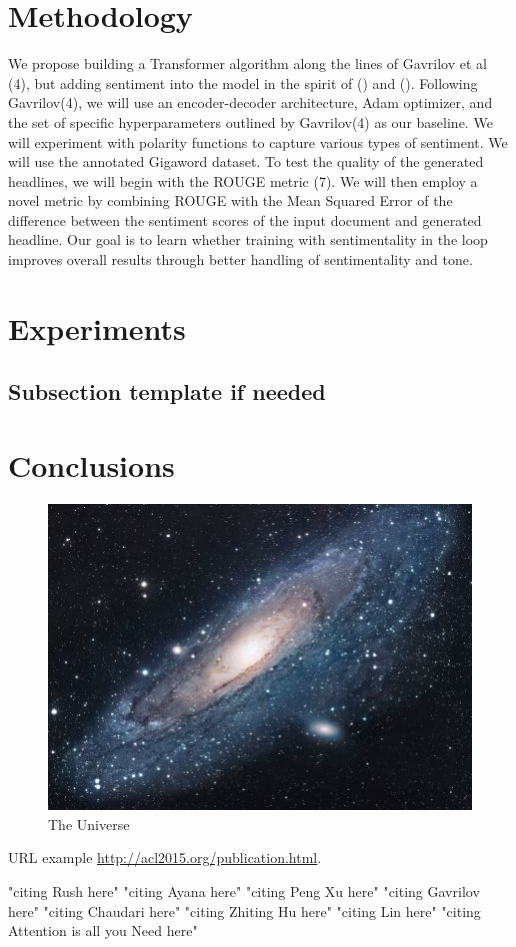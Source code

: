\documentclass[11pt]{article}
\begin{document}
\section{Methodology}
We propose building a Transformer algorithm along the lines of Gavrilov et al (4), but adding sentiment into the model in the spirit of () and (). Following Gavrilov(4), we will use an encoder-decoder architecture, Adam optimizer, and the set of specific hyperparameters outlined by Gavrilov(4) as our baseline. We will experiment with polarity functions to capture various types of sentiment. We will use the annotated Gigaword dataset. 
	To test the quality of the generated headlines, we will begin with the ROUGE metric (7). We will then employ a novel metric by combining ROUGE with the Mean Squared Error of the difference between the sentiment scores of the input document and generated headline. Our goal is to learn whether training with sentimentality in the loop improves overall results through better handling of sentimentality and tone.
\section{Experiments}
\subsection{Subsection template if needed}
\section{Conclusions}

\begin{figure}[h!]
\centering
\includegraphics[scale=1.7]{universe}
\caption{The Universe}
\label{fig:universe}
\end{figure}

URL example
\url{http://acl2015.org/publication.html}.

"citing Rush here" \citep{rush2015neural}
"citing Ayana here" \cite{Ayana2017}
"citing Peng Xu here" \cite{DBLP:journals/corr/abs-1902-07110}
"citing Gavrilov here" \cite{DBLP:journals/corr/abs-1901-07786}
"citing Chaudari here" \cite{DBLP:journals/corr/abs-1802-09426}
"citing Zhiting Hu here" \cite{DBLP:journals/corr/HuYLSX17}
"citing Lin here" \cite{lin-2004-rouge}
"citing Attention is all you Need here" \cite{DBLP:journals/corr/VaswaniSPUJGKP17}



\end{document}
